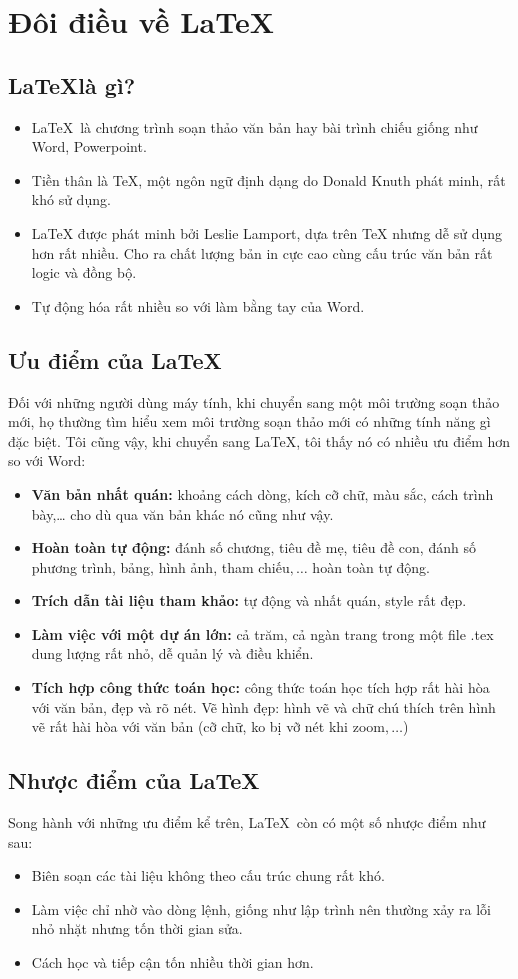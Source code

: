 \chapter{Đôi điều về \LaTeX}
\section{\LaTeX là gì?}
\begin{itemize}
	\item \LaTeX ~là chương trình soạn thảo văn bản hay bài trình chiếu giống như Word, Powerpoint.
	\item Tiền thân là TeX, một ngôn ngữ định dạng do Donald Knuth phát minh, rất khó sử dụng.
	\item LaTeX được phát minh bởi Leslie Lamport, dựa trên TeX nhưng dễ sử dụng hơn rất nhiều. Cho ra chất lượng bản in cực cao cùng cấu trúc văn bản rất logic và đồng bộ.
	\item Tự động hóa rất nhiều so với làm bằng tay của Word.
\end{itemize}
\section{Ưu điểm của \LaTeX}
Đối với những người dùng máy tính, khi chuyển sang một môi trường soạn thảo mới, họ thường tìm hiểu xem môi trường soạn thảo mới có những tính năng gì đặc biệt. Tôi cũng vậy, khi chuyển sang \LaTeX, tôi thấy nó có nhiều ưu điểm hơn so với Word:
\begin{itemize}
	\item\textbf{Văn bản nhất quán:} khoảng cách dòng, kích cỡ chữ, màu sắc, cách trình bày,… cho dù qua văn bản khác nó cũng như vậy.
	\item \textbf{Hoàn toàn tự động:} đánh số chương, tiêu đề mẹ, tiêu đề con, đánh số phương trình, bảng, hình ảnh, tham chiếu$,\ldots$ hoàn toàn tự động.
	\item \textbf{Trích dẫn tài liệu tham khảo:} tự động và nhất quán, style rất đẹp.
	\item \textbf{Làm việc với một dự án lớn:} cả trăm, cả ngàn trang trong một file .tex dung lượng rất nhỏ, dễ quản lý và điều khiển.
	\item \textbf{Tích hợp công thức toán học:} công thức toán học tích hợp rất hài hòa với văn bản, đẹp và rõ nét.
	Vẽ hình đẹp: hình vẽ và chữ chú thích trên hình vẽ rất hài hòa với văn bản (cỡ chữ, ko bị vỡ nét khi zoom$,\ldots$)
\end{itemize}
\section{Nhược điểm của \LaTeX}
Song hành với những ưu điểm kể trên, \LaTeX ~còn có một số nhược điểm như sau:
\begin{itemize}
	\item Biên soạn các tài liệu không theo cấu trúc chung rất khó.
	\item Làm việc chỉ nhờ vào dòng lệnh, giống như lập trình nên thường xảy ra lỗi nhỏ nhặt nhưng tốn thời gian sửa.
	\item Cách học và tiếp cận tốn nhiều thời gian hơn.
\end{itemize}
